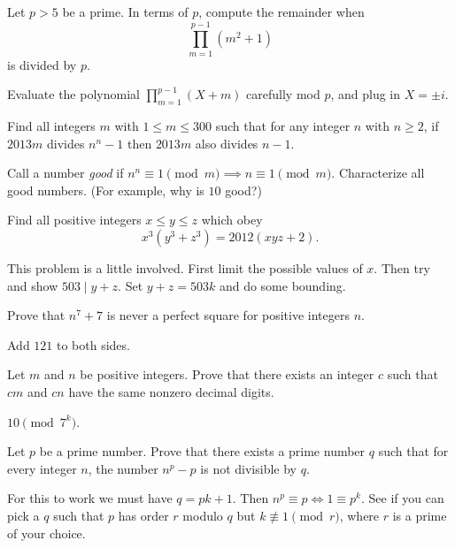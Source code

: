 \documentclass[11pt]{scrartcl}
\begin{document}
\begin{problem}
  Let $p > 5$ be a prime.
  In terms of $p$, compute the remainder when
  \[ \prod_{m=1}^{p-1} \left( m^2+1 \right) \]
  is divided by $p$.
  \begin{hint}
    Evaluate the polynomial $\prod_{m=1}^{p-1} (X+m)$ carefully mod $p$, and plug in $X = \pm i$.
  \end{hint}
\end{problem}

\begin{problem}
  \label{prob:omo}
  Find all integers $m$ with $1 \le m \le 300$ such that
  for any integer $n$ with $n \ge 2$,
  if $2013m$ divides $n^n-1$ then $2013m$ also divides $n-1$.
  \begin{hint}
    Call a number \emph{good} if $n^n \equiv 1 \pmod m \implies n \equiv 1 \pmod m$.
    Characterize all good numbers.
    (For example, why is $10$ good?)
  \end{hint}
\end{problem}

\begin{problem}
  [Shortlist 2012 N2]
  Find all positive integers $x \le y \le z$ which obey
  \[ x^3(y^3+z^3) = 2012(xyz+2). \]
  \begin{hint}
    This problem is a little involved.
    First limit the possible values of $x$.
    Then try and show $503 \mid y+z$.
    Set $y+z=503k$ and do some bounding.
  \end{hint}
\end{problem}

\begin{problem}
  \label{prob:tst}
  Prove that $n^7+7$ is never a perfect square for positive integers $n$.
  \begin{hint}
    Add $121$ to both sides.
  \end{hint}
\end{problem}

\begin{problem}
  [USAMO 2013/5] Let $m$ and $n$ be positive integers.
  Prove that there exists an integer $c$ such that $cm$ and $cn$ have the same nonzero decimal digits.
  \begin{hint}
    $10 \pmod{7^k}$.
  \end{hint}
\end{problem}

\begin{problem}
  [IMO 2003/6]
  \label{prob:imo}
  Let $p$ be a prime number.
  Prove that there exists a prime number $q$ such that for every integer $n$,
  the number $n^p-p$ is not divisible by $q$.
  \begin{hint}
    For this to work we must have $q=pk+1$. Then $n^p \equiv p \iff 1 \equiv p^k$.
    See if you can pick a $q$ such that $p$ has order $r$ modulo $q$
    but $k \not\equiv 1 \pmod{r}$, where $r$ is a prime of your choice.
  \end{hint}
\end{problem}
\end{document}

